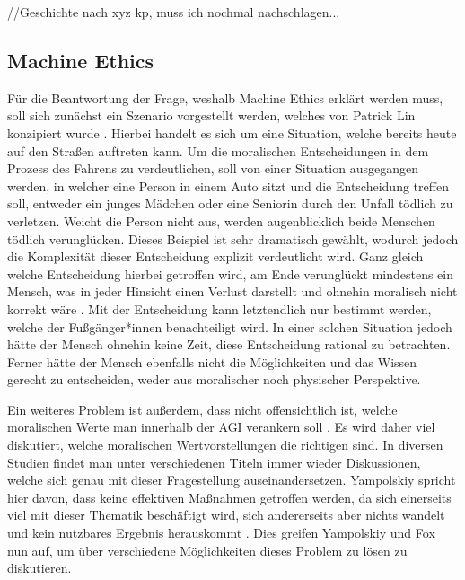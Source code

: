             //Geschichte nach xyz kp, muss ich nochmal nachschlagen...
        \subsection{Machine Ethics}
            Für die Beantwortung der Frage, weshalb Machine Ethics erklärt werden muss, soll sich zunächst ein Szenario
            vorgestellt werden, welches von Patrick Lin konzipiert wurde \cite[s. 70]{maurer_gerdes_lenz_winner_2015}.
            Hierbei handelt es sich um eine Situation, welche bereits heute auf den Straßen auftreten kann. Um die
            moralischen Entscheidungen in dem Prozess des Fahrens zu verdeutlichen, soll von einer Situation ausgegangen
            werden, in welcher eine Person in einem Auto sitzt und die Entscheidung treffen soll, entweder ein junges
            Mädchen oder eine Seniorin durch den Unfall tödlich zu verletzen. Weicht die Person nicht aus, werden augenblicklich
            beide Menschen tödlich verunglücken. Dieses Beispiel ist sehr dramatisch gewählt, wodurch jedoch die Komplexität
            dieser Entscheidung explizit verdeutlicht wird. Ganz gleich welche Entscheidung hierbei getroffen wird, am
            Ende verunglückt mindestens ein Mensch, was in jeder Hinsicht einen Verlust darstellt und ohnehin moralisch
            nicht korrekt wäre \cite[s. 70]{maurer_gerdes_lenz_winner_2015}. Mit der Entscheidung kann letztendlich nur
            bestimmt werden, welche der Fußgänger*innen benachteiligt wird. In einer solchen Situation jedoch hätte der
            Mensch ohnehin keine Zeit, diese Entscheidung rational zu betrachten. Ferner hätte der Mensch ebenfalls nicht
            die Möglichkeiten und das Wissen gerecht zu entscheiden, weder aus moralischer noch physischer Perspektive.

            Ein weiteres Problem ist außerdem, dass nicht offensichtlich ist, welche moralischen Werte man innerhalb der
            AGI verankern soll \cite[s. 1]{yampolskiy2013safety}. Es wird daher viel diskutiert, welche moralischen
            Wertvorstellungen die richtigen sind. In diversen Studien findet man unter verschiedenen Titeln immer
            wieder Diskussionen, welche sich genau mit dieser Fragestellung auseinandersetzen. Yampolskiy spricht hier
            davon, dass keine effektiven Maßnahmen getroffen werden, da sich einerseits viel mit dieser Thematik
            beschäftigt wird, sich andererseits aber nichts wandelt und kein nutzbares Ergebnis herauskommt \cite[s. 1]{yampolskiy2013safety}.
            Dies greifen Yampolskiy und Fox nun auf, um über verschiedene Möglichkeiten dieses Problem zu lösen zu diskutieren.

